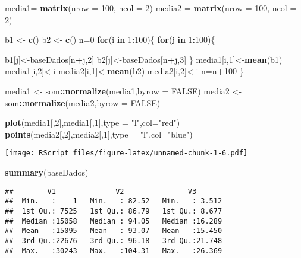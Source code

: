 \documentclass[]{article}
\newenvironment{Shaded}{\begin{snugshade}}{\end{snugshade}}
\newcommand{\KeywordTok}[1]{\textcolor[rgb]{0.13,0.29,0.53}{\textbf{#1}}}
\newcommand{\DataTypeTok}[1]{\textcolor[rgb]{0.13,0.29,0.53}{#1}}
\newcommand{\DecValTok}[1]{\textcolor[rgb]{0.00,0.00,0.81}{#1}}
\newcommand{\StringTok}[1]{\textcolor[rgb]{0.31,0.60,0.02}{#1}}
\newcommand{\OtherTok}[1]{\textcolor[rgb]{0.56,0.35,0.01}{#1}}
\newcommand{\ControlFlowTok}[1]{\textcolor[rgb]{0.13,0.29,0.53}{\textbf{#1}}}
\newcommand{\OperatorTok}[1]{\textcolor[rgb]{0.81,0.36,0.00}{\textbf{#1}}}
\newcommand{\NormalTok}[1]{#1}
\begin{document}
\begin{Shaded}
\begin{Highlighting}[]
\NormalTok{media1=}\StringTok{ }\KeywordTok{matrix}\NormalTok{(}\DataTypeTok{nrow =} \DecValTok{100}\NormalTok{, }\DataTypeTok{ncol =} \DecValTok{2}\NormalTok{)}
\NormalTok{media2 =}\StringTok{ }\KeywordTok{matrix}\NormalTok{(}\DataTypeTok{nrow =} \DecValTok{100}\NormalTok{, }\DataTypeTok{ncol =} \DecValTok{2}\NormalTok{)}

\NormalTok{b1 <-}\StringTok{ }\KeywordTok{c}\NormalTok{()}
\NormalTok{b2 <-}\StringTok{ }\KeywordTok{c}\NormalTok{()}
\NormalTok{n=}\DecValTok{0}
\ControlFlowTok{for}\NormalTok{(i }\ControlFlowTok{in} \DecValTok{1}\OperatorTok{:}\DecValTok{100}\NormalTok{)\{}
  \ControlFlowTok{for}\NormalTok{(j }\ControlFlowTok{in} \DecValTok{1}\OperatorTok{:}\DecValTok{100}\NormalTok{)\{}
  
\NormalTok{    b1[j]<-baseDados[n}\OperatorTok{+}\NormalTok{j,}\DecValTok{2}\NormalTok{]}
\NormalTok{    b2[j]<-baseDados[n}\OperatorTok{+}\NormalTok{j,}\DecValTok{3}\NormalTok{]}
\NormalTok{    \}}
\NormalTok{  media1[i,}\DecValTok{1}\NormalTok{]<-}\KeywordTok{mean}\NormalTok{(b1)}
\NormalTok{  media1[i,}\DecValTok{2}\NormalTok{]<-i}
\NormalTok{  media2[i,}\DecValTok{1}\NormalTok{]<-}\KeywordTok{mean}\NormalTok{(b2)}
\NormalTok{  media2[i,}\DecValTok{2}\NormalTok{]<-i}
\NormalTok{  n=n}\OperatorTok{+}\DecValTok{100}
\NormalTok{\}}


\NormalTok{media1 <-}\StringTok{ }\NormalTok{som}\OperatorTok{::}\KeywordTok{normalize}\NormalTok{(media1,}\DataTypeTok{byrow =} \OtherTok{FALSE}\NormalTok{)}
\NormalTok{media2 <-}\StringTok{ }\NormalTok{som}\OperatorTok{::}\KeywordTok{normalize}\NormalTok{(media2,}\DataTypeTok{byrow =} \OtherTok{FALSE}\NormalTok{)}

\KeywordTok{plot}\NormalTok{(media1[,}\DecValTok{2}\NormalTok{],media1[,}\DecValTok{1}\NormalTok{],}\DataTypeTok{type =} \StringTok{"l"}\NormalTok{,}\DataTypeTok{col=}\StringTok{"red"}\NormalTok{)}
\KeywordTok{points}\NormalTok{(media2[,}\DecValTok{2}\NormalTok{],media2[,}\DecValTok{1}\NormalTok{],}\DataTypeTok{type =} \StringTok{"l"}\NormalTok{,}\DataTypeTok{col=}\StringTok{"blue"}\NormalTok{)}
\end{Highlighting}
\end{Shaded}

\texttt{[image: RScript\_files/figure-latex/unnamed-chunk-1-6.pdf]}

\begin{Shaded}
\begin{Highlighting}[]
\KeywordTok{summary}\NormalTok{(baseDados)}
\end{Highlighting}
\end{Shaded}

\begin{verbatim}
##        V1              V2               V3        
##  Min.   :    1   Min.   : 82.52   Min.   : 3.512  
##  1st Qu.: 7525   1st Qu.: 86.79   1st Qu.: 8.677  
##  Median :15058   Median : 94.05   Median :16.289  
##  Mean   :15095   Mean   : 93.07   Mean   :15.450  
##  3rd Qu.:22676   3rd Qu.: 96.18   3rd Qu.:21.748  
##  Max.   :30243   Max.   :104.31   Max.   :26.369
\end{verbatim}
\end{document}
